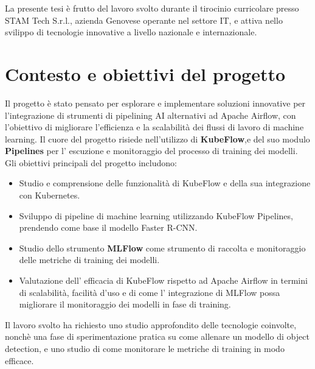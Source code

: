 La presente tesi è frutto del lavoro svolto durante il tirocinio curricolare presso STAM Tech S.r.l.,
azienda Genovese operante nel settore IT, e attiva nello svilippo di tecnologie innovative a livello nazionale e internazionale.

\section{Contesto e obiettivi del progetto}

Il progetto è stato pensato per esplorare e implementare soluzioni innovative per l'integrazione di strumenti di pipelining AI alternativi ad Apache Airflow, con l'obiettivo di migliorare l'efficienza e la scalabilità
dei flussi di lavoro di machine learning.
Il cuore del progetto risiede nell'utilizzo di \textbf{KubeFlow},e del suo modulo \textbf{Pipelines} per l' escuzione e monitoraggio del processo di training dei modelli.
\\

Gli obiettivi principali del progetto includono:
\begin{itemize}
    \item Studio e comprensione delle funzionalità di KubeFlow e della sua integrazione con Kubernetes.
    \item Sviluppo di pipeline di machine learning utilizzando KubeFlow Pipelines, prendendo come base il modello Faster R-CNN.\@
    \item Studio dello strumento \textbf{MLFlow} come strumento di raccolta e monitoraggio delle metriche di training dei modelli.
    \item Valutazione dell' efficacia di KubeFlow rispetto ad Apache Airflow in termini di scalabilità, facilità d'uso e di come l' integrazione
    di MLFlow possa migliorare il monitoraggio dei modelli in fase di training.
\end{itemize}

Il lavoro svolto ha richiesto uno studio approfondito delle tecnologie coinvolte, nonchè una fase di sperimentazione pratica su come allenare un modello di object detection,
e uno studio di come monitorare le metriche di training in modo efficace.